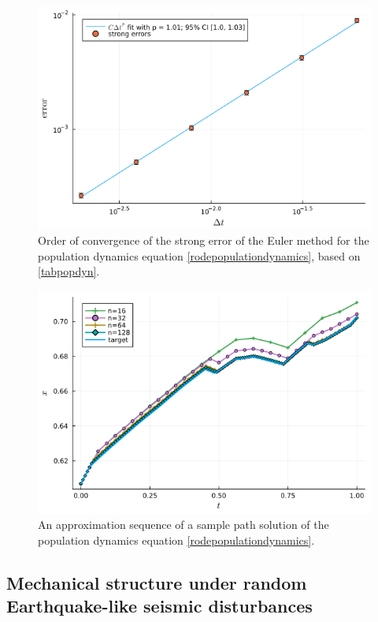 \documentclass[reqno,12pt]{amsart}
\theoremstyle{plain} %
\theoremstyle{definition} %
\begin{document}
\begin{figure}[htb]
    \includegraphics[scale=0.6]{img/order_popdyn_gBmPoisson.png}
    \caption{Order of convergence of the strong error of the Euler method for the population dynamics equation \eqref{rodepopulationdynamics}, based on \cref{tabpopdyn}.}
    \label{figpopdyn}
\end{figure}

\begin{figure}[htb]
    \includegraphics[scale=0.6]{img/sample_popdyn_gBmPoisson.png}
    \caption{An approximation sequence of a sample path solution of the population dynamics equation \eqref{rodepopulationdynamics}.}
    \label{figsamplepopdyn}
\end{figure}

\subsection{Mechanical structure under random Earthquake-like seismic disturbances}
\end{document}
